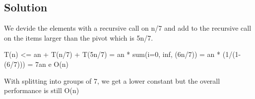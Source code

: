 \subsection*{Solution}

We devide the elements with a recursive call on n/7 and add to the recursive call on the items larger than the pivot which is 5n/7.

T(n) <= an + T(n/7) + T(5n/7)
      = an * sum(i=0, inf, (6n/7))
      = an * (1/(1- (6/7)))
      = 7an  e O(n)

With splitting into groups of 7, we get a lower constant but the overall performance is still O(n)

